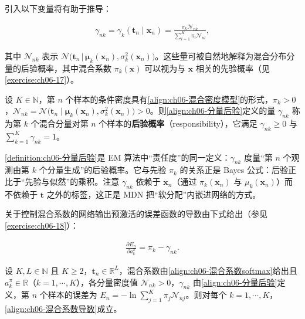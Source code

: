 \documentclass[../../main.tex]{subfiles}
\begin{document}
引入以下变量将有助于推导：

\begin{align}
\gamma_{nk}=\gamma_k(\boldsymbol{t}_n\mid\boldsymbol{x}_n)=\frac{\pi_k\mathcal{N}_{nk}}{\sum_{l=1}^{K}\pi_l\mathcal{N}_{nl}},
\label{align:ch06-分量后验}
\end{align}

其中 $\mathcal{N}_{nk}$ 表示 $\mathcal{N}\bigl(\boldsymbol{t}_n\,\big|\,\boldsymbol{\mu}_k(\boldsymbol{x}_n),\sigma_k^{2}(\boldsymbol{x}_n)\bigr)$。这些量可被自然地解释为混合分布分量的后验概率，其中混合系数 $\pi_k(\boldsymbol{x})$ 可以视为与 $\boldsymbol{x}$ 相关的先验概率（见\cref{exercise:ch06-17}）。

\begin{definition}[分量后验概率]\label{definition:ch06-分量后验}
设 $K\in\mathbb{N}$，第 $n$ 个样本的条件密度具有\eqref{align:ch06-混合密度模型}的形式，$\pi_{k}>0$，$\mathcal{N}_{nk}=\mathcal{N}\bigl(\boldsymbol{t}_{n}\mid\boldsymbol{\mu}_{k}(\boldsymbol{x}_{n}),\sigma_{k}^{2}(\boldsymbol{x}_{n})\bigr)>0$。则\eqref{align:ch06-分量后验}定义的量 $\gamma_{nk}$ 称为第 $k$ 个混合分量对第 $n$ 个样本的\textbf{后验概率}（responsibility），它满足 $\gamma_{nk}\geqslant0$ 与 $\sum_{k=1}^{K}\gamma_{nk}=1$。
\end{definition}

\begin{remark}\cref{definition:ch06-分量后验}是 EM 算法中“责任度”的同一定义：$\gamma_{nk}$ 度量“第 $n$ 个观测由第 $k$ 个分量生成”的后验概率。它与先验 $\pi_k$ 的关系正是 Bayes 公式：后验正比于“先验与似然”的乘积。注意 $\gamma_{nk}$ 依赖于 $\boldsymbol{x}_n$（通过 $\pi_k(\boldsymbol{x}_n)$ 与 $\mu_k(\boldsymbol{x}_n)$）而不依赖于 $\boldsymbol{t}$ 之外的标签，这正是 MDN 把“软分配”内嵌进网络的方式。
\end{remark}

关于控制混合系数的网络输出预激活的误差函数的导数由下式给出（参见\cref{exercise:ch06-18}）：

\begin{align}
\frac{\partial E_n}{\partial a_k^{\pi}}=\pi_k-\gamma_{nk}.
\label{align:ch06-混合系数导数}
\end{align}

\begin{proposition}[混合系数预激活的导数]\label{proposition:ch06-混合系数导数}
设 $K,L\in\mathbb{N}$ 且 $K\geqslant2$，$\boldsymbol{t}_{n}\in\mathbb{R}^{L}$，混合系数由\eqref{align:ch06-混合系数softmax}给出且 $a_{k}^{\pi}\in\mathbb{R}$（$k=1,\cdots,K$），各分量密度值 $\mathcal{N}_{nk}>0$，$\gamma_{nk}$ 由\eqref{align:ch06-分量后验}定义，第 $n$ 个样本的误差为 $E_{n}=-\ln\sum_{j=1}^{K}\pi_{j}\mathcal{N}_{nj}$。则对每个 $k=1,\cdots,K$，\eqref{align:ch06-混合系数导数}成立。
\end{proposition}
\end{document}
